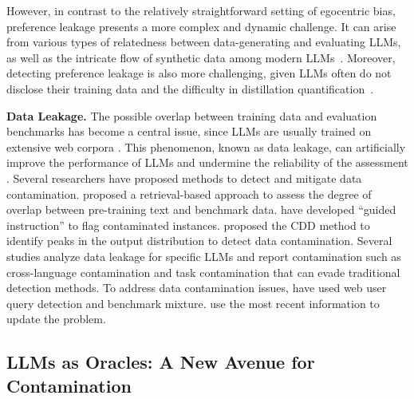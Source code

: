 \documentclass{article} %
\begin{document}
However, in contrast to the relatively straightforward setting of egocentric bias, preference leakage presents a more complex and dynamic challenge. It can arise from various types of relatedness between data-generating and evaluating LLMs, as well as the intricate flow of synthetic data among modern LLMs~\cite{tan2024large}. Moreover, detecting preference leakage is also more challenging, given LLMs often do not disclose their training data and the difficulty in distillation quantification~\cite{wadhwa2025taught, lee2025distillation}.




\textbf{Data Leakage.} The possible overlap between training data and evaluation benchmarks has become a central issue, since LLMs are usually trained on extensive web corpora 
\cite{dodge2021documenting}. This phenomenon, known as data leakage, can artificially improve the performance of LLMs and undermine the reliability of the assessment \cite{deng2024unveiling, jiang2024investigating,li2025s}. Several researchers have proposed methods to detect and mitigate data contamination. \citet{deng2024investigating} proposed a retrieval-based approach to assess the degree of overlap between pre-training text and benchmark data. \citet{golchin2023time} have developed ``guided instruction'' to flag contaminated instances. \citet{dong2024generalization} proposed the CDD method to identify peaks in the output distribution to detect data contamination. Several studies analyze data leakage for specific LLMs \cite{balloccu2024leak,xu2024benchmark} and report contamination such as cross-language contamination \cite{yao2024data} and task contamination \cite{li2024task} that can evade traditional detection methods. To address data contamination issues, \citet{ni2024mixeval} have used web user query detection and benchmark mixture. \citet{white2024livebench} use the most recent information to update the problem.

\subsection{LLMs as Oracles: A New Avenue for Contamination}
\end{document}
